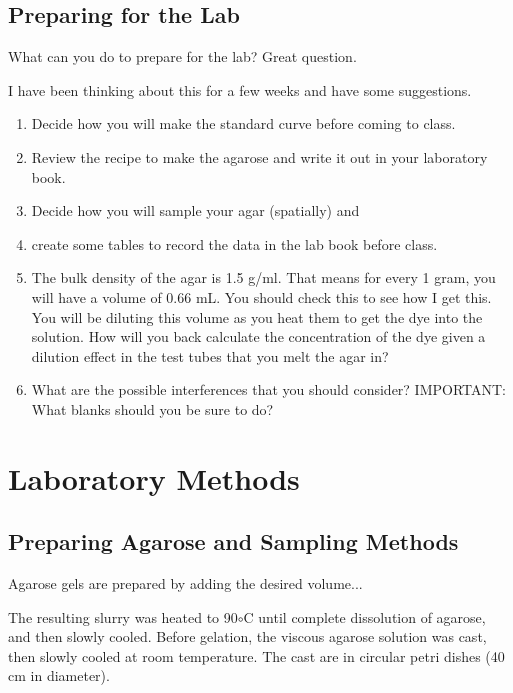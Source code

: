 \documentclass{article}
\begin{document}
\subsection{Preparing for the Lab}

What can you do to prepare for the lab?  Great question. 

I have been thinking about this for a few weeks and have some suggestions.

\begin{enumerate}
	\item Decide how you will make the standard curve before coming to class.
	\item Review the recipe to make the agarose and write it out in your laboratory book.
	\item Decide how you will sample your agar (spatially) and 
	\item create some tables to record the data in the lab book before class.

	\item The bulk density of the agar is 1.5 g/ml. That means for every 1 gram, you will have a volume of 0.66 mL.  You should check this to see how I get this.  You will be diluting this volume as you heat them to get the dye into the solution. How will you back calculate the concentration of the dye given a dilution effect in the test tubes that  you melt the agar in?

	\item What are the possible interferences that you should consider?  IMPORTANT: What blanks should you be sure to do?
\end{enumerate}


\section{Laboratory Methods}

\subsection{Preparing Agarose and Sampling Methods}

Agarose gels are prepared by adding the desired volume... 

The resulting slurry was heated to 90$\circ$C until complete dissolution of agarose, and then slowly cooled. Before gelation, the viscous agarose solution was cast, then slowly cooled at room temperature. The cast are in circular petri dishes (40 cm in diameter).
\end{document}
